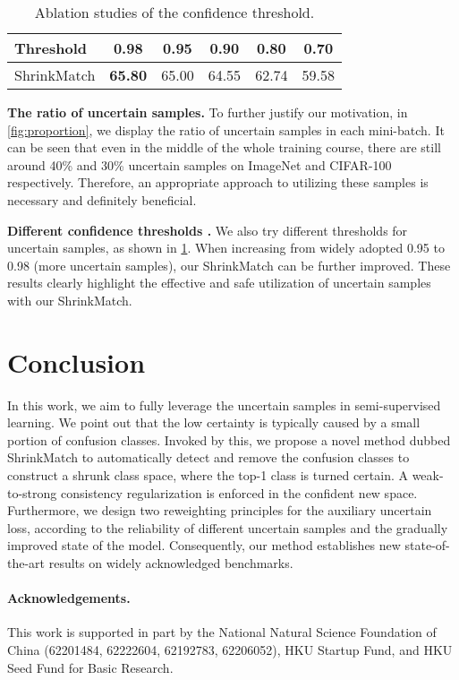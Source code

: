 \documentclass[10pt,twocolumn,letterpaper]{article}
\begin{document}
\begin{table}[t]
\centering
\small
\setlength\tabcolsep{2.4mm}
    \centering
    \begin{tabular}{l|ccccc}
    \toprule
    
    Threshold & 0.98 & 0.95 & 0.90 & 0.80 & 0.70 \\
    
    \midrule
    
    ShrinkMatch & \textbf{65.80} & 65.00 & 64.55 & 62.74 & 59.58 \\
    
    \bottomrule

    \end{tabular}
    \vspace{-1mm}
    \caption{Ablation studies of the confidence threshold.}
    \vspace{-2mm}
    \label{tab:ablation_threshold}
\end{table} 
\vspace{1mm}
\noindent
\textbf{The ratio of uncertain samples.} To further justify our motivation, in \cref{fig:proportion}, we display the ratio of uncertain samples in each mini-batch. It can be seen that even in the middle of the whole training course, there are still around 40\% and 30\% uncertain samples on ImageNet and CIFAR-100 respectively. Therefore, an appropriate approach to utilizing these samples is necessary and definitely beneficial.


\vspace{1mm}
\noindent
\textbf{Different confidence thresholds .} We also try different thresholds for uncertain samples, as shown in \cref{tab:ablation_threshold}. When increasing  from widely adopted 0.95 to 0.98 (more uncertain samples), our ShrinkMatch can be further improved. These results clearly highlight the effective and safe utilization of uncertain samples with our ShrinkMatch. \vspace{2.5mm}
\section{Conclusion}

In this work, we aim to fully leverage the uncertain samples in semi-supervised learning. We point out that the low certainty is typically caused by a small portion of confusion classes. Invoked by this, we propose a novel method dubbed ShrinkMatch to automatically detect and remove the confusion classes to construct a shrunk class space, where the top-1 class is turned certain. A weak-to-strong consistency regularization is enforced in the confident new space. Furthermore, we design two reweighting principles for the auxiliary uncertain loss, according to the reliability of different uncertain samples and the gradually improved state of the model. Consequently, our method establishes new state-of-the-art results on widely acknowledged benchmarks.

\paragraph{Acknowledgements.} This work is supported in part by the National Natural Science Foundation of China (62201484, 62222604, 62192783, 62206052), HKU Startup Fund, and HKU Seed Fund for Basic Research. 
\clearpage

{\small


}
\end{document}
